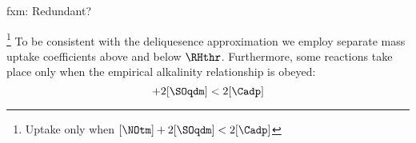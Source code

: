 \documentclass[12pt,twoside]{book}
\newcounter{reaction} %
\begin{document}
fxm: Redundant?
\begin{table}
\begin{minipage}{\hsize} %
\renewcommand{\footnoterule}{\rule{\hsize}{0.0cm}\vspace{-0.0cm}} %
\begin{center}
\caption[Uptake coefficients in Global Mineral Dust Model]{\textbf{Uptake
coefficients in Global Mineral Dust Model}%
\footnote{\emph{Source:} 
Source of best guess value. 
Most values adopted from \cite{DCZ96},
$\RHthr = 50\%$
}%
\label{tbl:mss_upt_cff_mdl}}
\vspace{\cpthdrhlnskp}
\end{center}
\end{minipage}
\end{table}
\footnote{Uptake only when $[\NOtm] + 2[\SOqdm] < 2[\Cadp]$}
To be consistent with the deliquesence approximation we 
employ separate mass uptake coefficients above and below $\RHthr$.
Furthermore, some reactions take place only when the empirical
alkalinity relationship is obeyed:
\begin{equation}
[\NOtm] + 2[\SOqdm] < 2[\Cadp] %
\end{equation}
\end{document}
